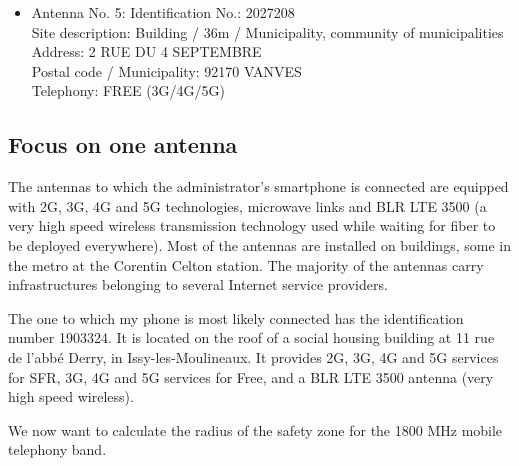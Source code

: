 \documentclass[12]{article}
\begin{document}
\begin{itemize}
Site description: Building / 37m / Social housing company \\

Address: 13 B R AUGUSTE GERVAIS \\

Postal code / Municipality: 92130 ISSY LES MOULINEAUX \\

Telephony: ORANGE (2G/3G/4G/5G) \\

    \item [$\bullet$] Antenna No. 5: Identification No.: 2027208 \\

Site description: Building / 36m / Municipality, community of municipalities \\

Address: 2 RUE DU 4 SEPTEMBRE \\

Postal code / Municipality: 92170 VANVES \\

Telephony: FREE (3G/4G/5G) \\


\end{itemize}

\subsection{Focus on one antenna}


The antennas to which the administrator's smartphone is connected are equipped with 2G, 3G, 4G and 5G technologies, microwave links and BLR LTE 3500 (a very high speed wireless transmission technology used while waiting for fiber to be deployed everywhere).
Most of the antennas are installed on buildings, some in the metro at the Corentin Celton station. The majority of the antennas carry infrastructures belonging to several Internet service providers.

The one to which my phone is most likely connected has the identification number 1903324. It is located on the roof of a social housing building at 11 rue de l'abbé Derry, in Issy-les-Moulineaux. It provides 2G, 3G, 4G and 5G services for SFR, 3G, 4G and 5G services for Free, and a BLR LTE 3500 antenna (very high speed wireless).


We now want to calculate the radius of the safety zone for the 1800 MHz mobile telephony band.
\end{document}
